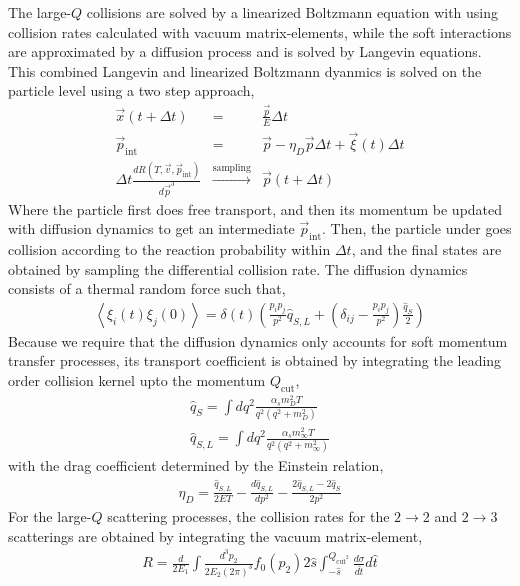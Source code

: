 \documentclass[aps, prc, reprint, amsmath, groupedaddress, nofootinbib]{revtex4-1}
\begin{document}
The large-$Q$ collisions are solved by a linearized Boltzmann equation with using collision rates calculated with vacuum matrix-elements, while the soft interactions are approximated by a diffusion process and is solved by Langevin equations.
This combined Langevin and linearized Boltzmann dyanmics is solved on the particle level using a two step approach,
\begin{eqnarray}
\vec{x}(t+\Delta t) &=& \frac{\vec{p}}{E}\Delta t\\
\vec{p}_{\textrm{int}} &=& \vec{p} - \eta_D \vec{p} \Delta t + \vec{\xi}(t) \Delta t\\
\Delta t\frac{dR(T, \vec{v}, \vec{p}_{\textrm{int}})}{d\vec{p}^3} &\xrightarrow{\textrm{sampling}}& \vec{p}(t+\Delta t)
\end{eqnarray}
Where the particle first does free transport, and then its momentum be updated with diffusion dynamics to get an intermediate $\vec{p}_{\textrm{int}}$. 
Then, the particle under goes collision according to the reaction probability within $\Delta t$, and the final states are obtained by sampling the differential collision rate.
The diffusion dynamics consists of a thermal random force such that,
\begin{eqnarray}
\left\langle\xi_i(t)\xi_j(0)\right\rangle = \delta(t) \left(
\frac{p_i p_j}{p^2}\hat{q}_{S, L} + \left(
\delta_{ij}-\frac{p_i p_j}{p^2}
\right)\frac{\hat{q}_S}{2} 
\right)
\end{eqnarray}
Because we require that the diffusion dynamics only accounts for soft momentum transfer processes, its transport coefficient is obtained by integrating the leading order collision kernel upto the momentum $Q_{\textrm{cut}}$,
\begin{eqnarray}
\hat{q}_S = \int dq^2 \frac{\alpha_s m_D^2 T}{q^2 (q^2+m_D^2)} \\
\hat{q}_{S,L} = \int dq^2 \frac{\alpha_s m_\infty^2 T}{q^2 (q^2+m_\infty^2)}
\end{eqnarray}
with the drag coefficient determined by the Einstein relation,
\begin{eqnarray}
\eta_D = \frac{\hat{q}_{S,L}}{2ET} - \frac{d\hat{q}_{S,L}}{dp^2} - \frac{2\hat{q}_{S,L} - 2\hat{q}_S}{2p^2}
\end{eqnarray}
For the large-$Q$ scattering processes, the collision rates for the $2\rightarrow 2$ and $2\rightarrow 3$ scatterings are obtained by integrating the vacuum matrix-element,
\begin{eqnarray}
R = \frac{d}{2E_1}\int  \frac{d^3p_2}{2E_2(2\pi)^3} f_0(p_2)2\hat{s} \int_{-\hat{s}}^{Q_{\textrm{cut}^2}}\frac{d\sigma}{d\hat{t}}d\hat{t}
\end{eqnarray}
\end{document}
